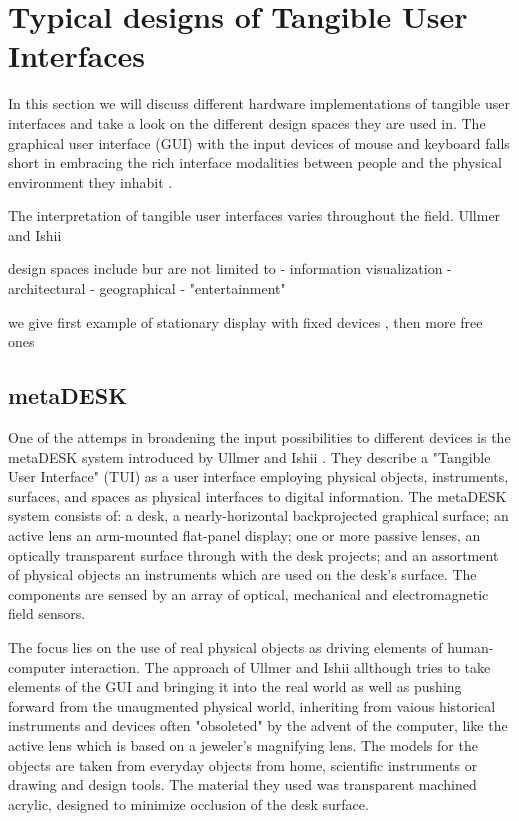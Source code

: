 \section{Typical designs of Tangible User Interfaces}

In this section we will discuss different hardware implementations of tangible user interfaces and take a look on the different design spaces they are used in. 
The graphical user interface (GUI) with the input devices of mouse and keyboard falls short in embracing the rich interface modalities between people and the physical environment they inhabit \cite{ullmer97}. 

The interpretation of tangible user interfaces varies throughout the field. Ullmer and Ishii \cite{ullmer97} 

design spaces include bur are not limited to
- information visualization
- architectural
- geographical
- "entertainment"


we give first example of stationary display with fixed devices , then more free ones


\subsection{metaDESK}
One of the attemps in broadening the input possibilities to different devices is the metaDESK system introduced by Ullmer and Ishii \cite{ullmer97}. They describe a "Tangible User Interface" (TUI) as a user interface employing physical objects, instruments, surfaces, and spaces as physical interfaces to digital information. The metaDESK system consists of: a desk, a nearly-horizontal backprojected graphical surface; an active lens an arm-mounted flat-panel display; one or more passive lenses, an optically transparent surface through with the desk projects; and an assortment of physical objects an instruments which are used on the desk's surface. The components are sensed by an array of optical, mechanical and electromagnetic field sensors.

The focus lies on the use of real physical objects as driving elements of human-computer interaction. The approach of Ullmer and Ishii allthough tries to take elements of the GUI and bringing it into the real world as well as pushing forward from the unaugmented physical world, inheriting from vaious historical instruments and devices often "obsoleted" by the advent of the computer, like the active lens which is based on a jeweler's magnifying lens. The models for the objects are taken from everyday objects from home, scientific instruments or drawing and design tools. The material they used was transparent machined acrylic, designed to minimize occlusion of the desk surface.

